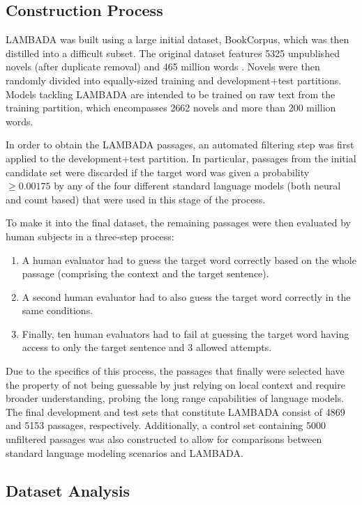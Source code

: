 \subsection{Construction Process}

LAMBADA was built using a large initial dataset, BookCorpus, which was then distilled into a difficult subset. The original dataset features 5325 unpublished novels (after duplicate removal) and 465 million words \cite{zhu2015aligning}. Novels were then randomly divided into equally-sized training and development+test partitions. Models tackling LAMBADA are intended to be trained on raw text from the training partition, which encompasses 2662 novels and more than 200 million words.

In order to obtain the LAMBADA passages, an automated filtering step was first applied to the development+test partition. In particular, passages from the initial candidate set were discarded if the target word was given a probability $\geq 0.00175$ by any of the four different standard language models (both neural and count based) that were used in this stage of the process.

To make it into the final dataset, the remaining passages were then evaluated by human subjects in a three-step process:

\begin{enumerate}
	\item A human evaluator had to guess the target word correctly based on the whole passage (comprising the context and the target sentence).
	\item A second human evaluator had to also guess the target word correctly in the same conditions.
	\item Finally, ten human evaluators had to fail at guessing the target word having access to only the target sentence and 3 allowed attempts.
\end{enumerate}

Due to the specifics of this process, the passages that finally were selected have the property of not being guessable by just relying on local context and require broader understanding, probing the long range capabilities of language models. The final development and test sets that constitute LAMBADA consist of 4869 and 5153 passages, respectively. Additionally, a control set containing 5000 unfiltered passages was also constructed to allow for comparisons between standard language modeling scenarios and LAMBADA.

\subsection{Dataset Analysis}

